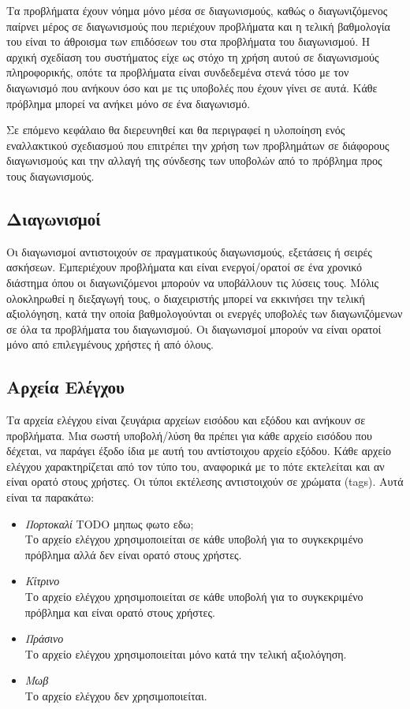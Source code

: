 \documentclass[diploma]{softlab-thesis}
\begin{document}
\bigskip

Τα προβλήματα έχουν νόημα μόνο μέσα σε διαγωνισμούς, καθώς ο διαγωνιζόμενος
παίρνει μέρος σε διαγωνισμούς που περιέχουν προβλήματα και η τελική βαθμολογία
του είναι το άθροισμα των επιδόσεων του στα προβλήματα του διαγωνισμού. Η
αρχική σχεδίαση του συστήματος είχε ως στόχο τη χρήση αυτού σε διαγωνισμούς
πληροφορικής, οπότε τα προβλήματα είναι συνδεδεμένα στενά τόσο με τον
διαγωνισμό που ανήκουν όσο και με τις υποβολές που έχουν γίνει σε αυτά. Κάθε
πρόβλημα μπορεί να ανήκει μόνο σε ένα διαγωνισμό.

\bigskip

Σε επόμενο κεφάλαιο θα διερευνηθεί και θα περιγραφεί η υλοποίηση ενός εναλλακτικού
σχεδιασμού που επιτρέπει την χρήση των προβλημάτων σε διάφορους διαγωνισμούς και
την αλλαγή της σύνδεσης των υποβολών από το πρόβλημα προς τους διαγωνισμούς.

\subsection{Διαγωνισμοί}

Οι διαγωνισμοί αντιστοιχούν σε πραγματικούς διαγωνισμούς, εξετάσεις ή σειρές
ασκήσεων. Εμπεριέχουν προβλήματα και είναι ενεργοί/ορατοί σε ένα χρονικό
διάστημα όπου οι διαγωνιζόμενοι μπορούν να υποβάλλουν τις λύσεις τους. Μόλις
ολοκληρωθεί η διεξαγωγή τους, ο διαχειριστής μπορεί να εκκινήσει την τελική
αξιολόγηση, κατά την οποία βαθμολογούνται οι ενεργές υποβολές των
διαγωνιζόμενων σε όλα τα προβλήματα του διαγωνισμού. Οι διαγωνισμοί μπορούν να
είναι ορατοί μόνο από επιλεγμένους χρήστες ή από όλους.

\subsection{Αρχεία Ελέγχου}

Τα αρχεία ελέγχου είναι ζευγάρια αρχείων εισόδου και εξόδου και ανήκουν σε
προβλήματα. Μια σωστή υποβολή/λύση θα πρέπει για κάθε αρχείο εισόδου
που δέχεται, να παράγει έξοδο ίδια με αυτή του αντίστοιχου αρχείο εξόδου.
Κάθε αρχείο ελέγχου χαρακτηρίζεται από τον τύπο του, αναφορικά με το πότε
εκτελείται και αν είναι ορατό στους χρήστες. Οι τύποι εκτέλεσης αντιστοιχούν
σε χρώματα (tags). Αυτά είναι τα παρακάτω:

\begin{itemize}
  \item \textit{Πορτοκαλί} TODO μηπως φωτο εδω; \\
      Το αρχείο ελέγχου χρησιμοποιείται σε κάθε υποβολή για το συγκεκριμένο πρόβλημα
      αλλά δεν είναι ορατό στους χρήστες.
    \item \textit{Κίτρινο} \\
      Το αρχείο ελέγχου χρησιμοποιείται σε κάθε υποβολή για το συγκεκριμένο πρόβλημα
      και είναι ορατό στους χρήστες.
    \item \textit{Πράσινο} \\
      Το αρχείο ελέγχου χρησιμοποιείται μόνο κατά την τελική αξιολόγηση.
    \item \textit{Μωβ} \\
      Το αρχείο ελέγχου δεν χρησιμοποιείται.
\end{itemize}
\end{document}
